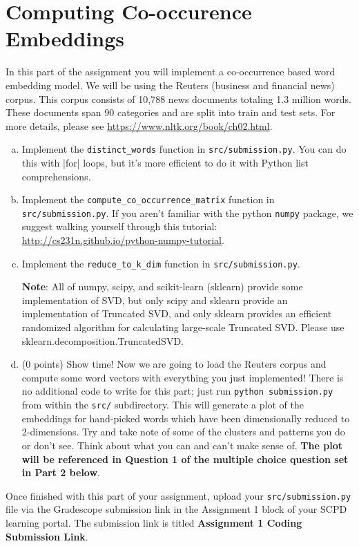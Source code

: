 \section{Computing Co-occurence Embeddings}
In this part of the assignment you will implement a co-occurrence based word embedding model. We will be using the Reuters (business and financial news) corpus. This corpus consists of 10,788 news documents totaling 1.3 million words. These documents span 90 categories and are split into train and test sets. For more details, please see \url{https://www.nltk.org/book/ch02.html}. \newline

\begin{enumerate}[(a)]
    \item {} Implement the \texttt{distinct\_words} function in \texttt{src/submission.py}. You can do this with |for| loops, but it's more efficient to do it with Python list comprehensions.
    
    \item {} Implement the \texttt{compute\_co\_occurrence\_matrix} function in \texttt{src/submission.py}. If you aren't familiar with the python \texttt{numpy} package, we suggest walking yourself through this tutorial: \url{http://cs231n.github.io/python-numpy-tutorial}. 
    
    \item {} Implement the \texttt{reduce\_to\_k\_dim} function in \texttt{src/submission.py}. \newline
    
    \textbf{Note}: All of numpy, scipy, and scikit-learn (sklearn) provide some implementation of SVD, but only scipy and sklearn provide an implementation of Truncated SVD, and only sklearn provides an efficient randomized algorithm for calculating large-scale Truncated SVD. Please use sklearn.decomposition.TruncatedSVD.
    
    \item (0 points) Show time! Now we are going to load the Reuters corpus and compute some word vectors with everything you just implemented! There is no additional code to write for this part; just run \texttt{python submission.py} from within the \texttt{src/} subdirectory. This will generate a plot of the embeddings for hand-picked words which have been dimensionally reduced to 2-dimensions. Try and take note of some of the clusters and patterns you do or don't see. Think about what you can and can't make sense of. \textbf{The plot will be referenced in Question 1 of the multiple choice question set in Part 2 below}. 
\end{enumerate}

Once finished with this part of your assignment, upload your \texttt{src/submission.py} file via the Gradescope submission link in the Assignment 1 block of your SCPD learning portal. The submission link is titled \textbf{Assignment 1 Coding Submission Link}.
